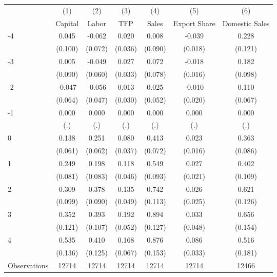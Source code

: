 \begin{tabular}{l*{6}{c}}
\hline\hline
                    &\multicolumn{1}{c}{(1)}&\multicolumn{1}{c}{(2)}&\multicolumn{1}{c}{(3)}&\multicolumn{1}{c}{(4)}&\multicolumn{1}{c}{(5)}&\multicolumn{1}{c}{(6)}\\
                    &\multicolumn{1}{c}{Capital}&\multicolumn{1}{c}{Labor}&\multicolumn{1}{c}{TFP}&\multicolumn{1}{c}{Sales}&\multicolumn{1}{c}{Export Share}&\multicolumn{1}{c}{Domestic Sales}\\
\hline
-4                  &       0.045&      -0.062&       0.020&       0.008&      -0.039&       0.228\\
                    &     (0.100)&     (0.072)&     (0.036)&     (0.090)&     (0.018)&     (0.121)\\
[1em]
-3                  &       0.005&      -0.049&       0.027&       0.072&      -0.018&       0.182\\
                    &     (0.090)&     (0.060)&     (0.033)&     (0.078)&     (0.016)&     (0.098)\\
[1em]
-2                  &      -0.047&      -0.056&       0.013&       0.025&      -0.010&       0.110\\
                    &     (0.064)&     (0.047)&     (0.030)&     (0.052)&     (0.020)&     (0.067)\\
[1em]
-1                  &       0.000&       0.000&       0.000&       0.000&       0.000&       0.000\\
                    &         (.)&         (.)&         (.)&         (.)&         (.)&         (.)\\
[1em]
0                   &       0.138&       0.251&       0.080&       0.413&       0.023&       0.363\\
                    &     (0.061)&     (0.062)&     (0.037)&     (0.072)&     (0.016)&     (0.086)\\
[1em]
1                   &       0.249&       0.198&       0.118&       0.549&       0.027&       0.402\\
                    &     (0.081)&     (0.083)&     (0.046)&     (0.093)&     (0.021)&     (0.109)\\
[1em]
2                   &       0.309&       0.378&       0.135&       0.742&       0.026&       0.621\\
                    &     (0.099)&     (0.090)&     (0.049)&     (0.113)&     (0.025)&     (0.126)\\
[1em]
3                   &       0.352&       0.393&       0.192&       0.894&       0.033&       0.656\\
                    &     (0.121)&     (0.107)&     (0.052)&     (0.127)&     (0.048)&     (0.154)\\
[1em]
4                   &       0.535&       0.410&       0.168&       0.876&       0.086&       0.516\\
                    &     (0.136)&     (0.125)&     (0.067)&     (0.153)&     (0.033)&     (0.181)\\
\hline
Observations        &       12714&       12714&       12714&       12714&       12714&       12466\\
\hline\hline
\end{tabular}
